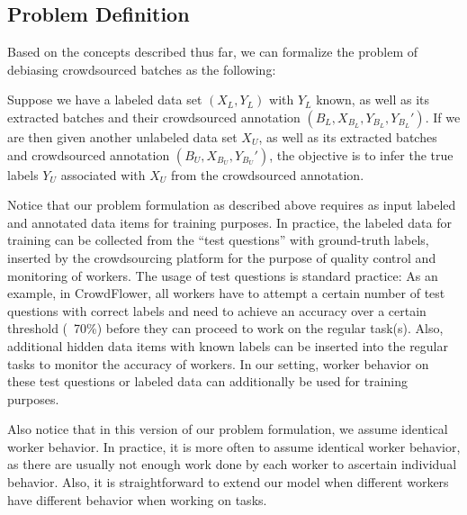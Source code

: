 \subsection{Problem Definition}

Based on the concepts described thus far, 
we can formalize the problem of debiasing crowdsourced batches as the following:

\begin{problem} 
Suppose we have a labeled data set $(X_L, Y_L)$ with $Y_L$ known, 
as well as its extracted batches and their crowdsourced annotation $(B_L, X_{B_L}, Y_{B_L}, Y_{B_L}')$.  
If we are then given another unlabeled data set $X_U$, 
as well as its extracted batches and crowdsourced annotation $(B_U, X_{B_U}, Y_{B_U}')$, 
the objective is to infer the true labels $Y_{U}$ associated with $X_{U}$ from the crowdsourced annotation.  
\end{problem}
Notice that our problem formulation as described above requires
as input labeled and annotated data items for training purposes. 
In practice, the labeled data for training 
can be collected from the ``test questions'' 
with ground-truth labels, 
inserted by the crowdsourcing platform for the 
purpose of quality control and monitoring
of workers.  
The usage of test questions is standard practice: 
As an example, in CrowdFlower, all workers have to attempt a 
certain number of test questions with correct labels 
and need to achieve an accuracy over a certain threshold (\eg~70\%) 
before they can proceed to work on the regular task(s).  
Also, additional hidden data items with known labels 
can be inserted into the regular tasks
to monitor the accuracy of workers.  
In our setting, worker behavior on these
test questions or labeled data can additionally be used
for training purposes.


Also notice that in this version of our problem
formulation, we assume identical worker behavior.  
In practice, it is more often to assume identical worker behavior, 
as there are usually not enough work done by each worker to ascertain individual behavior.
Also, it is straightforward to extend our model when 
different workers have different behavior when working on tasks.




